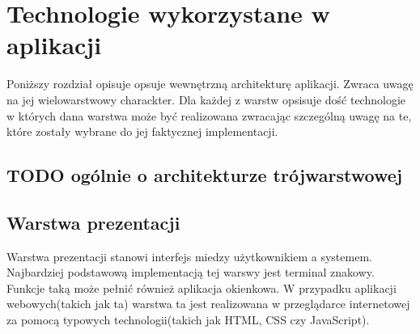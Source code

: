 \chapter{Technologie wykorzystane w aplikacji}
Poniższy rozdział opisuje opsuje wewnętrzną architekturę aplikacji. Zwraca uwagę na jej wielowarstwowy charackter. Dla każdej z warstw opsisuje dość technologie w których dana warstwa może być realizowana zwracając szczególną uwagę na te, które zostały wybrane do jej faktycznej implementacji.


\section{TODO ogólnie o architekturze trójwarstwowej}
\begin{comment}
\section[Aplikacja w architekturze wielowarstwowej][Aplikacja w architekturze wielowarstwowej]{Aplikacja w architekturze wielowarstwowej}
\subsection[Model klient-serwer][Model klient-serwer]{Model klient-serwer}
Najprostrzym wielowarswowej architektury aplikacji jest model typu klient-serwer. Wyróżnia on dwie warstwy:
\begin{itemize}
	\item klienta, stronę żądającą dostępu do jakiejś usługi bądź zasobu,
	\item serwera, stronę udostępniająca daną usługę lub zasób.
\end{itemize}
Architektura ta dobrze sprawdzająca
\section{}
Tworzony system będzie działał w architekturze trójwarstwowej. Architektura ta wyewoluowała z architektury typu klient-serwer

\end{comment}
\section[Warstwa prezentacji][Warstwa prezentacji]{Warstwa prezentacji}
Warstwa prezentacji stanowi interfejs miedzy użytkownikiem a systemem. Najbardziej podstawową implementacją tej warswy jest terminal znakowy. Funkcje taką może pełnić również aplikacja okienkowa. W przypadku aplikacji webowych(takich jak ta) warstwa ta jest realizowana w przeglądarce internetowej za pomocą typowych technologii(takich jak HTML, CSS czy JavaScript).


